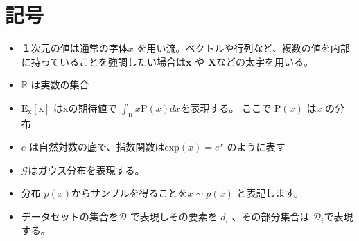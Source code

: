 \chapter*{記号}
\label{thanks}


\begin{itemize}
    \item １次元の値は通常の字体$ x $ を用い流。ベクトルや行列など、複数の値を内部に持っていることを強調したい場合は$ \mathbf{x} $ や $ \mathbf{X} $などの太字を用いる。
    \item $\mathbb{R}$ は実数の集合
    \item $\mathrm{E_x[x]}$ はxの期待値で $ \int_{\mathrm{R}} x \mathrm{P}(x) dx $を表現する。 ここで $ \mathrm{P}(x) $ は$ x $ の分布
    \item $e$ は自然対数の底で、指数関数は$\mathrm{exp}(x) = e^x$ のように表す
    \item $ \mathcal{G} $はガウス分布を表現する。
    \item 分布 $p(x)$からサンプルを得ることを$ x \sim p(x) $ と表記します。
    \item データセットの集合を$ \mathcal{D} $ で表現しその要素を $ d_i $ 、その部分集合は $ \mathcal{D}_i $で表現する。

\end{itemize}